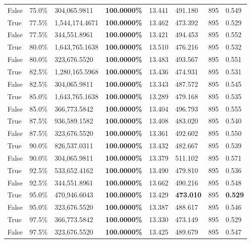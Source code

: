 \begin{table}[H]
\begin{tabular}{lllrllll}
\cline{1-8}
False & 75.0\% & 304,065.9811 & \bfseries \color{red} 100.0000\% & 13.441 & 491.180 & 895 & 0.549 \\
\cline{1-8}
True & 77.5\% & 1,544,174.4671 & \bfseries \color{red} 100.0000\% & 13.462 & 473.392 & 895 & 0.529 \\
\cline{1-8}
False & 77.5\% & 344,551.8961 & \bfseries \color{red} 100.0000\% & 13.421 & 494.453 & 895 & 0.552 \\
\cline{1-8}
True & 80.0\% & 1,643,765.1638 & \bfseries \color{red} 100.0000\% & 13.510 & 476.216 & 895 & 0.532 \\
\cline{1-8}
False & 80.0\% & 323,676.5520 & \bfseries \color{red} 100.0000\% & 13.483 & 493.567 & 895 & 0.551 \\
\cline{1-8}
True & 82.5\% & 1,280,165.5968 & \bfseries \color{red} 100.0000\% & 13.436 & 474.931 & 895 & 0.531 \\
\cline{1-8}
False & 82.5\% & 304,065.9811 & \bfseries \color{red} 100.0000\% & 13.343 & 487.572 & 895 & 0.545 \\
\cline{1-8}
True & 85.0\% & 1,643,765.1638 & \bfseries \color{red} 100.0000\% & 13.289 & 479.168 & 895 & 0.535 \\
\cline{1-8}
False & 85.0\% & 366,773.5842 & \bfseries \color{red} 100.0000\% & 13.404 & 496.793 & 895 & 0.555 \\
\cline{1-8}
True & 87.5\% & 936,589.1582 & \bfseries \color{red} 100.0000\% & 13.408 & 483.020 & 895 & 0.540 \\
\cline{1-8}
False & 87.5\% & 323,676.5520 & \bfseries \color{red} 100.0000\% & 13.361 & 492.602 & 895 & 0.550 \\
\cline{1-8}
True & 90.0\% & 826,537.0311 & \bfseries \color{red} 100.0000\% & 13.432 & 482.667 & 895 & 0.539 \\
\cline{1-8}
False & 90.0\% & 304,065.9811 & \bfseries \color{red} 100.0000\% & 13.379 & 511.102 & 895 & 0.571 \\
\cline{1-8}
True & 92.5\% & 533,652.4162 & \bfseries \color{red} 100.0000\% & 13.490 & 479.810 & 895 & 0.536 \\
\cline{1-8}
False & 92.5\% & 344,551.8961 & \bfseries \color{red} 100.0000\% & 13.662 & 490.216 & 895 & 0.548 \\
\cline{1-8}
True & 95.0\% & 470,946.6043 & \bfseries \color{red} 100.0000\% & 13.429 & \bfseries \color{red} 473.010 & 895 & \bfseries \color{red} 0.529 \\
\cline{1-8}
False & 95.0\% & 323,676.5520 & \bfseries \color{red} 100.0000\% & 13.387 & 488.617 & 895 & 0.546 \\
\cline{1-8}
True & 97.5\% & 366,773.5842 & \bfseries \color{red} 100.0000\% & 13.330 & 473.149 & 895 & 0.529 \\
\cline{1-8}
False & 97.5\% & 323,676.5520 & \bfseries \color{red} 100.0000\% & 13.425 & 489.679 & 895 & 0.547 \\
\cline{1-8}
\bottomrule
\end{tabular}
\end{table}
